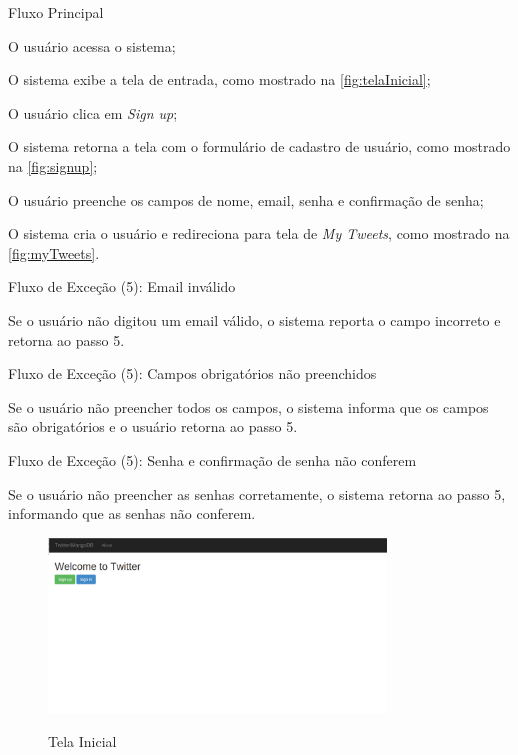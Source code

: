 Fluxo Principal\begin{enumerate}
{\setlength\itemindent{25pt}
    \item O usuário acessa o sistema;
    \item O sistema exibe a tela de entrada, como mostrado na \autoref{fig:telaInicial};
    \item O usuário clica em \textit{Sign up};
    \item O sistema retorna a tela com o formulário de cadastro de usuário, como mostrado na \autoref{fig:signup};
    \item O usuário preenche os campos de nome, email, senha e confirmação de senha;
    \item O sistema cria o usuário e redireciona para tela de \textit{My Tweets}, como mostrado na \autoref{fig:myTweets}.
}
\end{enumerate}

Fluxo de Exceção (5): Email inválido
\begin{enumerate}
{\setlength\itemindent{25pt}
\item Se o usuário não digitou um email válido, o sistema reporta o campo incorreto e retorna ao passo 5.
}
\end{enumerate}

Fluxo de Exceção (5): Campos obrigatórios não preenchidos
\begin{enumerate}
{\setlength\itemindent{25pt}
\item Se o usuário não preencher todos os campos, o sistema informa que os campos são obrigatórios e o usuário retorna ao passo 5.
}
\end{enumerate}

Fluxo de Exceção (5): Senha e confirmação de senha não conferem
\begin{enumerate}
{\setlength\itemindent{25pt}
\item Se o usuário não preencher as senhas corretamente, o sistema retorna ao passo 5, informando que as senhas não conferem.
}
\end{enumerate}

\begin{figure}[H]
    \centering
    \caption{Tela Inicial}
    \includegraphics[width=0.8\textwidth]{./04-figuras/PrimeiraTela.png}
    \label{fig:telaInicial}
\end{figure}

